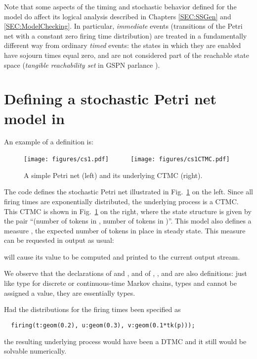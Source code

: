 Note that some aspects of the timing and stochastic behavior defined for the
model do affect its logical analysis described in Chapters \ref{SEC:SSGen}
and \ref{SEC:ModelChecking}.
In particular, \emph{immediate} events (transitions of the Petri net
with a constant zero firing time distribution)
are treated in a fundamentally different way from ordinary
\emph{timed} events: the states in which they are enabled
have sojourn times equal zero, and are not considered part of
the reachable state space (\emph{tangible reachability set} in
GSPN parlance \cite{Ajmone1995book}).



\section{Defining a stochastic Petri net model in {\smart}} \label{SEC:SPNdef}

An example of a  definition is:
%

%
\begin{figure}
  \centering
  \texttt{[image: figures/cs1.pdf]}
  ~~~~~
  \texttt{[image: figures/cs1CTMC.pdf]}
  \caption{A simple Petri net (left) and its underlying CTMC (right).}
  \label{FIG:cs1}
\end{figure} 
%
The code defines the stochastic Petri net  illustrated
in Fig.~\ref{FIG:cs1} on the left.
Since all firing times are exponentially distributed, the underlying
process is a CTMC.
This CTMC is shown in Fig.~\ref{FIG:cs1} on the right, where the state
structure is given by the pair
``(number of tokens in , number of tokens in )''.
This  model also defines a measure , the
expected number of tokens in place  in steady state.
This measure can be requested in output as usual:
%

%
will cause its value to be computed and printed to the current output stream.

We observe that the declarations of  and , and of ,
, and  are also definitions:
just like type  for discrete or continuous-time Markov chains,
types  and  cannot be assigned a value,
they are essentially  types.

Had the distributions for the firing times been specified as
\begin{lstlisting}
  firing(t:geom(0.2), u:geom(0.3), v:geom(0.1*tk(p)));
\end{lstlisting}
the resulting underlying process would have been a DTMC and it still would
be solvable numerically.

